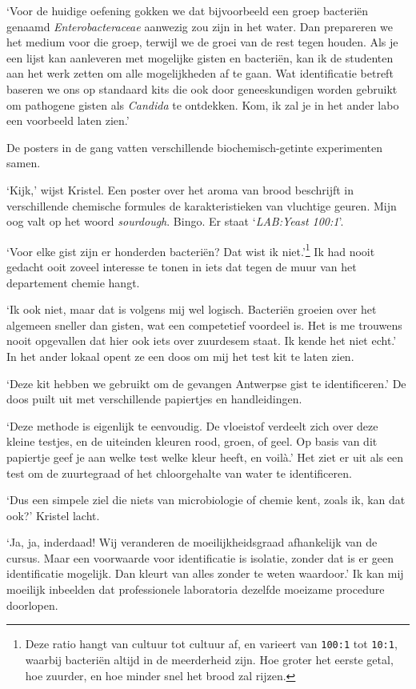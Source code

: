 \documentclass[
  11pt,
  dutch,
]{memoir}
\begin{document}
`Voor de huidige oefening gokken we dat bijvoorbeeld een groep bacteriën
genaamd \emph{Enterobacteraceae} aanwezig zou zijn in het water. Dan
prepareren we het medium voor die groep, terwijl we de groei van de rest
tegen houden. Als je een lijst kan aanleveren met mogelijke gisten en
bacteriën, kan ik de studenten aan het werk zetten om alle mogelijkheden
af te gaan. Wat identificatie betreft baseren we ons op standaard kits
die ook door geneeskundigen worden gebruikt om pathogene gisten als
\emph{Candida} te ontdekken. Kom, ik zal je in het ander labo een
voorbeeld laten zien.'

De posters in de gang vatten verschillende biochemisch-getinte
experimenten samen.

`Kijk,' wijst Kristel. Een poster over het aroma van brood beschrijft in
verschillende chemische formules de karakteristieken van vluchtige
geuren. Mijn oog valt op het woord \emph{sourdough}. Bingo. Er staat
`\emph{LAB:Yeast 100:1}'.

`Voor elke gist zijn er honderden bacteriën? Dat wist ik
niet.'\footnote{Deze ratio hangt van cultuur tot cultuur af, en varieert
  van \texttt{100:1} tot \texttt{10:1}, waarbij bacteriën altijd in de
  meerderheid zijn. Hoe groter het eerste getal, hoe zuurder, en hoe
  minder snel het brood zal rijzen.} Ik had nooit gedacht ooit zoveel
interesse te tonen in iets dat tegen de muur van het departement chemie
hangt.

`Ik ook niet, maar dat is volgens mij wel logisch. Bacteriën groeien
over het algemeen sneller dan gisten, wat een competetief voordeel is.
Het is me trouwens nooit opgevallen dat hier ook iets over zuurdesem
staat. Ik kende het niet echt.' In het ander lokaal opent ze een doos om
mij het test kit te laten zien.

`Deze kit hebben we gebruikt om de gevangen Antwerpse gist te
identificeren.' De doos puilt uit met verschillende papiertjes en
handleidingen.

`Deze methode is eigenlijk te eenvoudig. De vloeistof verdeelt zich over
deze kleine testjes, en de uiteinden kleuren rood, groen, of geel. Op
basis van dit papiertje geef je aan welke test welke kleur heeft, en
voilà.' Het ziet er uit als een test om de zuurtegraad of het
chloorgehalte van water te identificeren.

`Dus een simpele ziel die niets van microbiologie of chemie kent, zoals
ik, kan dat ook?' Kristel lacht.

`Ja, ja, inderdaad! Wij veranderen de moeilijkheidsgraad afhankelijk van
de cursus. Maar een voorwaarde voor identificatie is isolatie, zonder
dat is er geen identificatie mogelijk. Dan kleurt van alles zonder te
weten waardoor.' Ik kan mij moeilijk inbeelden dat professionele
laboratoria dezelfde moeizame procedure doorlopen.
\end{document}
